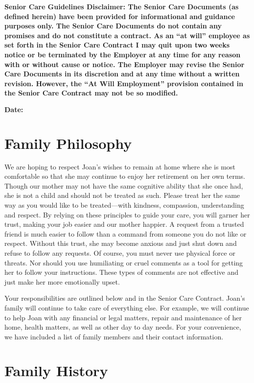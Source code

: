 \documentclass[]{article}
\begin{document}
\textbf{Senior Care Guidelines Disclaimer: The Senior Care Documents (as defined herein) have been provided for informational and guidance purposes only. The Senior Care Documents do not contain any promises and do not constitute a contract. As an ``at will'' employee as set forth in the Senior Care Contract I may quit upon two weeks notice or be terminated by the Employer at any time for any reason with or without cause or notice. The Employer may revise the Senior Care Documents in its discretion and at any time without a written revision. However, the ``At Will Employment'' provision contained in the Senior Care Contract may not be so modified.} 

\textbf{Date:}

\section*{Family Philosophy}
We are hoping to respect Joan's wishes to remain at home where she is most comfortable so that she may continue to enjoy her retirement on her own terms. Though our mother may not have the same cognitive ability that she once had, she is not a child and should not be treated as such.  Please treat her the same way as you would like to be treated---with kindness, compassion, understanding and respect. By relying on these principles to guide your care, you will garner her trust, making your job easier and our mother happier. A request from a trusted friend is much easier to follow than a command from someone you do not like or respect. Without this trust, she may become anxious and just shut down and refuse to follow any requests. Of course, you must never use physical force or threats. Nor should you use humiliating or cruel comments as a tool for getting her to follow your instructions. These types of comments are not effective and just make her more emotionally upset.

Your responsibilities are outlined below and in the Senior Care Contract. Joan's family will continue to take care of everything else.  For example, we will continue to help Joan with any financial or legal matters, repair and maintenance of her home, health matters, as well as other day to day needs. For your convenience, we have included a list of family members and their contact information.

\section*{Family History}
\end{document}
